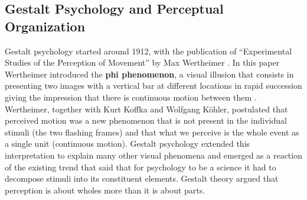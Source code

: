 \subsection{Gestalt Psychology and Perceptual Organization}


Gestalt psychology
started around 1912, with the publication of “Experimental Studies of the Perception of Movement” by Max Wertheimer \cite{wertheimer1912experimentelle}. In this paper Wertheimer introduced the {\bf phi phenomenon}, a visual illusion that consists in presenting two images with a vertical bar at different locations in rapid succession giving the impression that there is continuous motion between them \cite{steinman2000phi}.
Wertheimer, together with Kurt Koffka and Wolfgang Köhler, postulated that perceived motion was a new phenomenon that is not present in the individual stimuli (the two flashing frames) and that what we perceive is the whole event as a single unit (continuous motion). Gestalt psychology extended this interpretation to explain many other visual phenomena and emerged as a reaction of the existing trend that said that for psychology to be a science it had to decompose stimuli into its constituent elements. Gestalt theory argued that perception is about wholes more than it is about parts.



